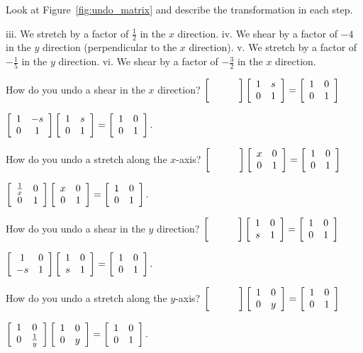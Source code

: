 \documentclass[../key.tex]{subfiles}
\begin{document}
\begin{outer_problem}
\item Look at Figure~\ref{fig:undo_matrix} and describe the transformation in each step.
\end{outer_problem}

iii. We stretch by a factor of $\frac{1}{2}$ in the $x$ direction.
iv. We shear by a factor of $-4$ in the $y$ direction (perpendicular to the $x$ direction).
v. We stretch by a factor of $-\frac{1}{5}$ in the $y$ direction.
vi. We shear by a factor of $-\frac{3}{2}$ in the $x$ direction.

\begin{outer_problem}
\item
\end{outer_problem}

\begin{inner_problem}[start=1]
\item How do you undo a shear in the $x$ direction?
$\blanktwomat\twomat{1}{s}{0}{1}=\twomat{1}{0}{0}{1}$
\end{inner_problem}

$\left[\begin{array}{cc} 1 & -s \\ 0 & 1 \end{array}\right]\left[\begin{array}{cc} 1 & s \\ 0 & 1 \end{array}\right]=\left[\begin{array}{cc} 1 & 0 \\ 0 & 1 \end{array}\right].$

\begin{inner_problem}
\item How do you undo a stretch along the $x$-axis?
$\blanktwomat\twomat{x}{0}{0}{1}=\twomat{1}{0}{0}{1}$
\end{inner_problem}

$\left[\begin{array}{cc} \frac{1}{x} & 0 \\ 0 & 1 \end{array}\right]\left[\begin{array}{cc} x & 0 \\ 0 & 1 \end{array}\right]=\left[\begin{array}{cc} 1 & 0 \\ 0 & 1 \end{array}\right].$

\begin{inner_problem}
\item How do you undo a shear in the $y$ direction?
$\blanktwomat\twomat{1}{0}{s}{1}=\twomat{1}{0}{0}{1}$
\end{inner_problem}

$\left[\begin{array}{cc} 1 & 0 \\ -s & 1 \end{array}\right]\left[\begin{array}{cc} 1 & 0 \\ s & 1 \end{array}\right]=\left[\begin{array}{cc} 1 & 0 \\ 0 & 1 \end{array}\right].$

\begin{inner_problem}
\item How do you undo a stretch along the $y$-axis?
$\blanktwomat\twomat{1}{0}{0}{y}=\twomat{1}{0}{0}{1}$
\end{inner_problem}

$\left[\begin{array}{cc} 1 & 0 \\ 0 & \frac{1}{y} \end{array}\right]\left[\begin{array}{cc} 1 & 0 \\ 0 & y \end{array}\right]=\left[\begin{array}{cc} 1 & 0 \\ 0 & 1 \end{array}\right].$
\end{document}
